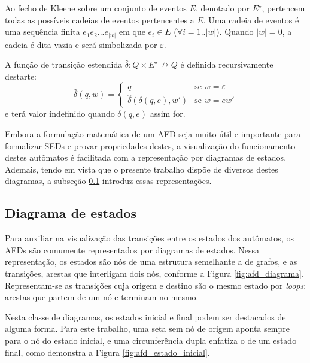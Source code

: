 Ao fecho de Kleene sobre um conjunto de eventos $E$, denotado por $E^\star$, pertencem todas as possíveis cadeias de eventos pertencentes a $E$. Uma cadeia de eventos é uma sequência finita $e_1 e_2 ... e_{|w|}$ em que $e_i \in E$ ($\forall i = 1..|w|$). Quando $|w| = 0$, a cadeia é dita vazia e será simbolizada por $\varepsilon$.

A função de transição estendida $\hat{\delta}:Q \times E^\star \nrightarrow Q$ é definida recursivamente destarte: $$\hat{\delta}(q, w) = \begin{cases}
q & \text{se $w=\varepsilon$} \\
\hat{\delta}(\delta(q, e), w') & \text{se $w=e w'$}
\end{cases}$$ e terá valor indefinido quando $\delta(q, e)$ assim for.

Embora a formulação matemática de um AFD seja muito útil e importante para formalizar SEDs e provar propriedades destes, a visualização do funcionamento destes autômatos é facilitada com a representação por diagramas de estados. Ademais, tendo em vista que o presente trabalho dispõe de diversos destes diagramas, a subseção \ref{subsec:diagramas} introduz essas representações.

\subsection{Diagrama de estados}
\label{subsec:diagramas}

Para auxiliar na visualização das transições entre os estados dos autômatos, os AFDs são comumente representados por diagramas de estados. Nessa representação, os estados são nós de uma estrutura semelhante a de grafos, e as transições, arestas que interligam dois nós, conforme a Figura \ref{fig:afd_diagrama}. Representam-se as transições cuja origem e destino são o mesmo estado por \textit{loops}: arestas que partem de um nó e terminam no mesmo.


Nesta classe de diagramas, os estados inicial e final podem ser destacados de alguma forma. Para este trabalho, uma seta sem nó de origem aponta sempre para o nó do estado inicial, e uma circunferência dupla enfatiza o de um estado final, como demonstra a Figura \ref{fig:afd_estado_inicial}.

